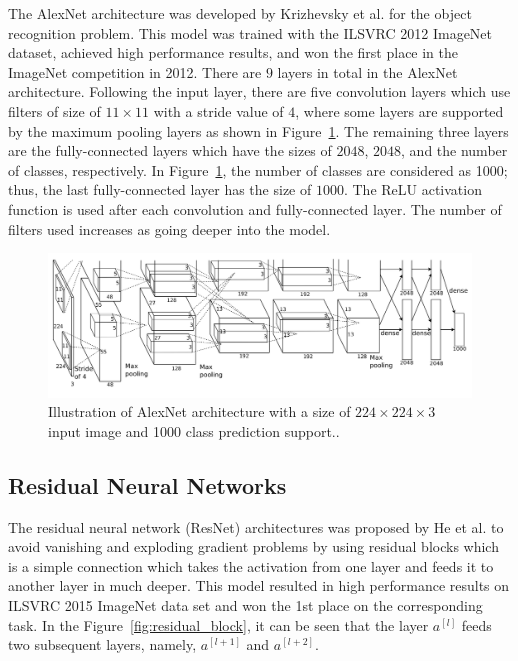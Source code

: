 The AlexNet architecture was developed by Krizhevsky et al. \cite{AlexNet} for the object recognition problem. This model was trained with the ILSVRC 2012 ImageNet \cite{imagenet} dataset, achieved high performance results, and won the first place in the ImageNet competition in 2012. There are $9$ layers in total in the AlexNet architecture. Following the input layer, there are five convolution layers which use filters of size of $11 \times 11$ with a stride value of $4$, where some layers are supported by the maximum pooling layers as shown in Figure~\ref{fig:alexnet_arch}. The remaining three layers are the fully-connected layers which have the sizes of $2048$, $2048$, and the number of classes, respectively. In Figure~\ref{fig:alexnet_arch}, the number of classes are considered as 1000; thus, the last fully-connected layer has the size of $1000$.  The ReLU activation function is used after each convolution and fully-connected layer. The number of filters used increases as going deeper into the model.

\begin{figure}[h]
    \centering
    \includegraphics[width=\linewidth]{fig/alexnet_arch.png}
    \caption{Illustration of AlexNet architecture with a size of $224 \times 224 \times 3$ input image and 1000 class prediction support.\cite{AlexNet}.}
    \label{fig:alexnet_arch}
\end{figure}

\subsection{Residual Neural Networks}

The residual neural network (ResNet) architectures was proposed by He et al. \cite{ResNet} to avoid vanishing and exploding gradient problems by using residual blocks which is a simple connection which takes the activation from one layer and feeds it to another layer in much deeper. This model resulted in high performance results on ILSVRC 2015 ImageNet \cite{imagenet} data set and won the 1st place on the corresponding task. In the Figure~\ref{fig:residual_block}, it can be seen that the layer $a^{[l]}$ feeds two subsequent layers, namely, $a^{[l+1]}$ and $a^{[l+2]}$.

